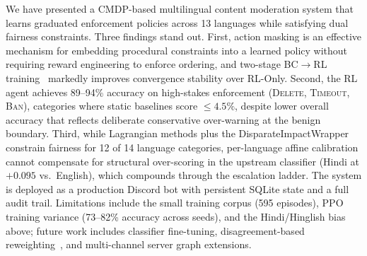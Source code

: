 \documentclass[journal]{IEEEtran}
\begin{document}
We have presented a CMDP-based multilingual content moderation system that learns
graduated enforcement policies across 13 languages while satisfying dual fairness
constraints. Three findings stand out. First, action masking is an effective mechanism
for embedding procedural constraints into a learned policy without requiring reward
engineering to enforce ordering, and two-stage BC$\to$RL training~\cite{liu2025meta}
markedly improves convergence stability over RL-Only. Second, the RL agent achieves
89--94\% accuracy on high-stakes enforcement (\textsc{Delete}, \textsc{Timeout},
\textsc{Ban}), categories where static baselines score $\leq 4.5\%$, despite lower
overall accuracy that reflects deliberate conservative over-warning at the benign
boundary. Third, while Lagrangian methods plus the DisparateImpactWrapper constrain
fairness for 12 of 14 language categories, per-language affine calibration cannot
compensate for structural over-scoring in the upstream classifier (Hindi at $+0.095$
vs.\ English), which compounds through the escalation ladder. The system is deployed
as a production Discord bot with persistent SQLite state and a full audit trail.
Limitations include the small training corpus (595 episodes), PPO training variance
(73--82\% accuracy across seeds), and the Hindi/Hinglish bias above; future work
includes classifier fine-tuning, disagreement-based reweighting~\cite{liu2025meta},
and multi-channel server graph extensions.
\end{document}

